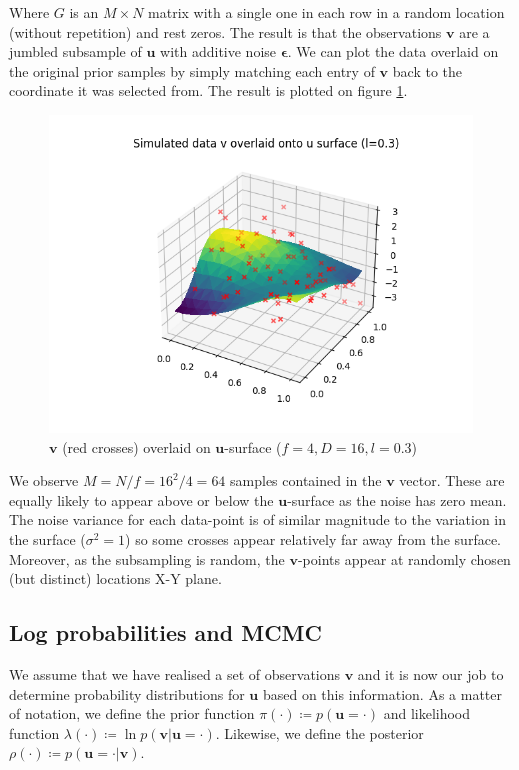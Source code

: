 \documentclass[]{article}
\newcommand{\figwidth}{0.4\linewidth}
\newcommand{\lik}{\lambda}
\newcommand{\ubold}{\boldsymbol{u}}
\newcommand{\vbold}{\boldsymbol{v}}
\newcommand{\epsbold}{\boldsymbol{\epsilon}}
\begin{document}
Where $G$ is an $M \times N$ matrix with a single one in each row in a random location (without repetition) and rest zeros. The result is that the observations $\vbold$ are a jumbled subsample of $\ubold$ with additive noise $\epsbold$. We can plot the data overlaid on the original prior samples by simply matching each entry of $\vbold$ back to the coordinate it was selected from. The result is plotted on figure \ref{fig:v-on-u}.
%
\begin{figure}[!h]
	\centering
	\includegraphics[width=\figwidth]{v-overlay.png}
	\caption{$\vbold$ (red crosses) overlaid on $\ubold$-surface ($f=4, D=16, l=0.3$)}
	\label{fig:v-on-u}
\end{figure}

We observe $M=N/f=16^2/4=64$ samples contained in the $\vbold$ vector. These are equally likely to appear above or below the $\ubold$-surface as the noise has zero mean. The noise variance for each data-point is of similar magnitude to the variation in the surface ($\sigma^2 = 1$) so some crosses appear relatively far away from the surface. Moreover, as the subsampling is random, the $\vbold$-points appear at randomly chosen (but distinct) locations X-Y plane.

\subsection{Log probabilities and MCMC}

We assume that we have realised a set of observations $\vbold$ and it is now our job to determine probability distributions for $\ubold$ based on this information. As a matter of notation, we define the prior function $\pi(\cdot) \coloneqq p(\ubold=\cdot)$ and likelihood function $\lik(\cdot) \coloneqq \ln p (\vbold | \ubold = \cdot)$. Likewise, we define the posterior $\rho(\cdot) \coloneqq p(\ubold=\cdot | \vbold)$.
\end{document}
